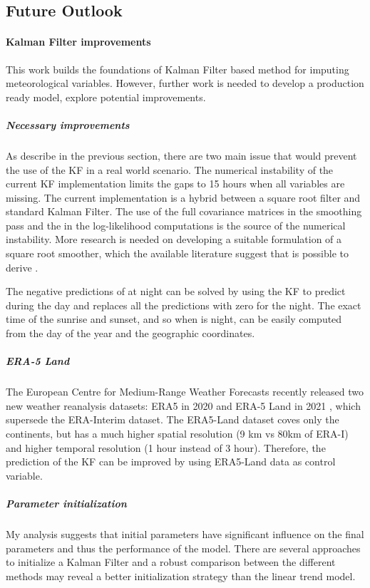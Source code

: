 \documentclass{article}
\let\Oldsubsection\subsection
\renewcommand{\subsection}{\FloatBarrier\Oldsubsection}
\begin{document}
\subsection{Future Outlook}

\paragraph{Kalman Filter improvements}

This work builds the foundations of Kalman Filter based method for imputing meteorological variables. However, further work is needed to develop a production ready model, explore potential improvements. 

\subparagraph{Necessary improvements} 
As describe in the previous section, there are two main issue that would prevent the use of the KF in a real world scenario.
The numerical instability of the current KF implementation limits the gaps to 15 hours when all variables are missing. The current implementation is a hybrid between a square root filter and standard Kalman Filter. The use of the full covariance matrices in the smoothing pass and the in the log-likelihood computations is the source of the numerical instability. More research is needed on developing a suitable formulation of a square root smoother, which the available literature suggest that is possible to derive \cite{rutten_square-root_2013, park_new_1996}. 

The negative predictions of  at night can be solved by using the KF to predict  during the day and replaces all the predictions with zero for the night. The exact time of the sunrise and sunset, and so when is night, can be easily computed from the day of the year and the geographic coordinates.

\subparagraph{ERA-5 Land} The European Centre for Medium-Range Weather Forecasts recently released two new weather reanalysis datasets: ERA5 in 2020 \cite{hersbach_era5_2020} and ERA-5 Land  in 2021 \cite{munoz-sabater_era5-land_2021}, which supersede the ERA-Interim dataset. The ERA5-Land dataset coves only the continents, but has a much higher spatial resolution (9 km vs 80km of ERA-I) and higher temporal resolution (1 hour instead of 3 hour). Therefore, the prediction of the KF can be improved by using ERA5-Land data as control variable.

\subparagraph{Parameter initialization} My analysis suggests that initial parameters have significant influence on the final parameters and thus the performance of the model. There are several approaches to initialize a Kalman Filter \cite{durbin_time_2012} and a robust comparison between the different methods may reveal a better initialization strategy than the linear trend model.  
\end{document}
